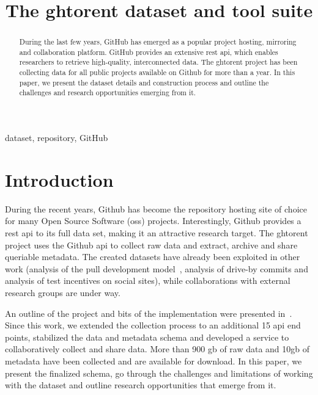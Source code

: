 \documentclass[conference]{IEEEtran}
\begin{document}
\title{The {\sc ght}orent dataset and tool suite}

\author{ 
}

\maketitle

\begin{abstract} 
  
  During the last few years, GitHub has emerged as a popular project hosting,
  mirroring and collaboration platform. GitHub provides an extensive {\sc rest
  api}, which enables researchers to retrieve high-quality, interconnected data.
  The {\sc ght}orent project has been collecting data for all public projects
  available on Github for more than a year. In this paper, we present the dataset
  details and construction process and outline the challenges and research
  opportunities emerging from it.

\end{abstract}

\begin{IEEEkeywords}
dataset, repository, GitHub
\end{IEEEkeywords}

\section{Introduction} During the recent years, Github has become the repository
hosting site of choice for many Open Source Software ({\sc oss}) projects.
Interestingly, Github provides a {\sc rest api} to its full data set, making it
an attractive research target. The {\sc ght}orent project uses the Github {\sc api}
to collect raw data and extract, archive and share queriable metadata. The
created datasets have already been exploited in other work (analysis of the pull
development model~\cite{GPD13}, analysis of drive-by commits and analysis of
test incentives on social sites),
while collaborations with external research groups are under way. 

An outline of the project and bits of the implementation were presented
in~\cite{GS12}. Since this work, we extended the collection process to an
additional 15 {\sc api} end points, stabilized the data and metadata schema and
developed a service to collaboratively collect and share data. More than 900{\sc
gb} of raw data and 10{\sc gb} of metadata have been collected and are available
for download. In this paper, we present the finalized schema, go through the
challenges and limitations of working with the dataset and outline research
opportunities that emerge from it.
\end{document}
